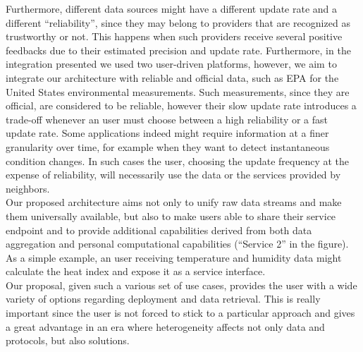 Furthermore, different data sources might have a different update rate and a different ``reliability'', since they may belong to providers that are recognized as trustworthy or not.
This happens when such providers receive several positive feedbacks due to their estimated precision and update rate.
Furthermore, in the integration presented we used two user-driven platforms, however, we aim to integrate our architecture with reliable and official data, such as EPA for the United States environmental measurements.
Such measurements, since they are official, are considered to be reliable, however their slow update rate introduces a trade-off whenever an user must choose between a high reliability or a fast update rate.
Some applications indeed might require information at a finer granularity over time, for example when they want to detect instantaneous condition changes.
In such cases the user, choosing the update frequency at the expense of reliability, will necessarily use the data or the services provided by neighbors.
\\
Our proposed architecture aims not only to unify raw data streams and make them universally available, but also to make users able to share their service endpoint and to provide additional capabilities derived from both data aggregation and personal computational capabilities (``Service 2'' in the figure).
As a simple example, an user receiving temperature and humidity data might calculate the heat index and expose it as a service interface.
\\
Our proposal, given such a various set of use cases, provides the user with a wide variety of options regarding deployment and data retrieval.
This is really important since the user is not forced to stick to a particular approach and gives a great advantage in an era where heterogeneity affects not only data and protocols, but also solutions.
